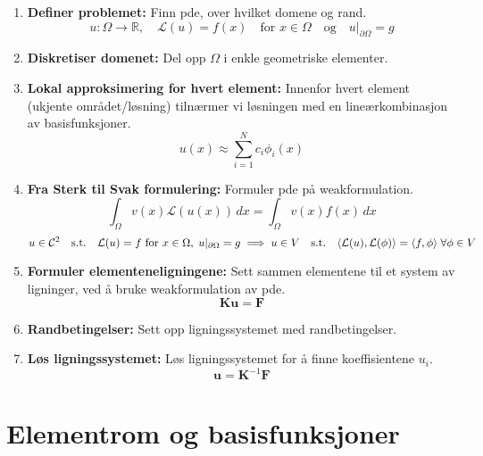 \documentclass[../main.tex]{subfiles}
\begin{document}
\begin{enumerate}
    \item \textbf{Definer problemet:} Finn pde, over hvilket domene og rand.
          \[
              u: \Omega \to \mathbb{R}, \quad \mathcal{L}(u) = f(x) \quad \text{for } x \in \Omega \quad \text{og} \quad u|_{\partial \Omega} = g
          \]
    \item \textbf{Diskretiser domenet:} Del opp \(\Omega\) i enkle geometriske elementer.
    \item \textbf{Lokal approksimering for hvert element:} Innenfor hvert element (ukjente området/løsning) tilnærmer vi løsningen med en lineærkombinasjon av basisfunksjoner.
          \[
              u(x) \approx \sum_{i=1}^N c_i \phi_i(x)
          \]
    \item \textbf{Fra Sterk til Svak formulering:} Formuler pde på weakformulation.
          \[
              \int_\Omega v(x) \mathcal{L}(u(x)) \, dx = \int_\Omega v(x) f(x) \, dx
          \]
          \[
              u \in \mathcal{C}^2 \quad \text{s.t.} \quad \mathcal{L}(u) = f \text{ for } x \in \Omega, \; u|_{\partial \Omega} = g
              \implies
              u \in V \quad \text{s.t.} \quad \inner*{\mathcal{L}(u), \mathcal{L}(\phi)} = \inner*{f, \phi} \; \forall \phi \in V
          \]
    \item \textbf{Formuler elementeneligningene:} Sett sammen elementene til et system av ligninger, ved å bruke weakformulation av pde.
          \[
              \symbf{K} \symbf{u} = \symbf{F}
          \]
    \item \textbf{Randbetingelser:} Sett opp ligningssystemet med randbetingelser.
    \item \textbf{Løs ligningssystemet:} Løs ligningssystemet for å finne koeffisientene \(u_i\).
          \[
              \symbf{u} = \symbf{K}^{-1} \symbf{F}
          \]
\end{enumerate}

\section{Elementrom og basisfunksjoner}
\end{document}
